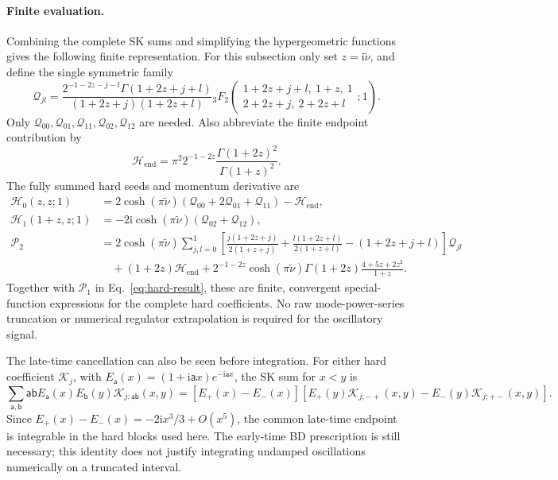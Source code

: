 \documentclass[a4paper,12pt]{article}
\newcommand{\ii}{\mathrm i}
\newcommand{\tn}{\tilde\nu}
\def\aa{\mathsf a}
\newcommand{\bb}{\mathsf b}
\begin{document}
\paragraph{Finite evaluation.}
Combining the complete SK sums and simplifying the hypergeometric
functions gives the following finite representation.
For this subsection only set $z=\ii\tn$, and define the single symmetric
family
\begin{equation}
 \mathcal Q_{jl}=\frac{2^{-1-2z-j-l}\Gamma(1+2z+j+l)}
 {(1+2z+j)(1+2z+l)}
 {}_3F_2\!\left(\begin{matrix}1+2z+j+l,\ 1+z,\ 1\\
 2+2z+j,\ 2+2z+l\end{matrix};1\right).
 \label{eq:finite-Q}
\end{equation}
Only $\mathcal Q_{00},\mathcal Q_{01},\mathcal Q_{11},
\mathcal Q_{02},\mathcal Q_{12}$ are needed. Also abbreviate the
finite endpoint contribution by
\begin{equation}
 \mathcal H_{\mathrm{end}}=\pi^2 2^{-1-2z}
 \frac{\Gamma(1+2z)^2}{\Gamma(1+z)^2}.
 \label{eq:endpoint-finite}
\end{equation}
The fully summed hard seeds and momentum derivative are
\begin{align}
 \mathcal H_0(z,z;1)
 &=2\cosh(\pi\tn)(\mathcal Q_{00}+2\mathcal Q_{01}+\mathcal Q_{11})
 -\mathcal H_{\mathrm{end}},\nonumber\\
 \mathcal H_1(1+z,z;1)
 &=-2\ii\cosh(\pi\tn)(\mathcal Q_{02}+\mathcal Q_{12}),
 \label{eq:finite-hard-seeds}\\
 \mathcal P_2
 &=2\cosh(\pi\tn)\sum_{j,l=0}^1
 \left[\frac{j(1+2z+j)}{2(1+z+j)}
 +\frac{l(1+2z+l)}{2(1+z+l)}-(1+2z+j+l)\right]\mathcal Q_{jl}
 \nonumber\\
 &\quad +(1+2z)\mathcal H_{\mathrm{end}}
 +2^{-1-2z}\cosh(\pi\tn)\Gamma(1+2z)
 \frac{4+5z+2z^2}{1+z}.
 \label{eq:finite-P2}
\end{align}
Together with $\mathcal P_1$ in Eq.~\eqref{eq:hard-result}, these are
finite, convergent special-function expressions for the complete hard
coefficients. No raw mode-power-series truncation or numerical
regulator extrapolation is required for the oscillatory signal.

The late-time cancellation can also be seen before integration.
For either hard coefficient $\mathcal K_j$, with
$E_{\aa}(x)=(1+\ii \aa x)e^{-\ii \aa x}$, the SK sum for $x<y$ is
\begin{equation}
 \sum_{\aa,\bb}\aa\bb E_{\aa}(x)E_{\bb}(y)\mathcal K_{j;\aa\bb}(x,y)
 =[E_+(x)-E_-(x)]
 [E_+(y)\mathcal K_{j;-+}(x,y)-E_-(y)\mathcal K_{j;+-}(x,y)].
 \label{eq:sk-endpoint-cancel}
\end{equation}
Since $E_+(x)-E_-(x)=-2\ii x^3/3+O(x^5)$, the common late-time
endpoint is integrable in the hard blocks used here. The early-time
BD prescription is still necessary; this identity does not justify
integrating undamped oscillations numerically on a truncated interval.
\end{document}
